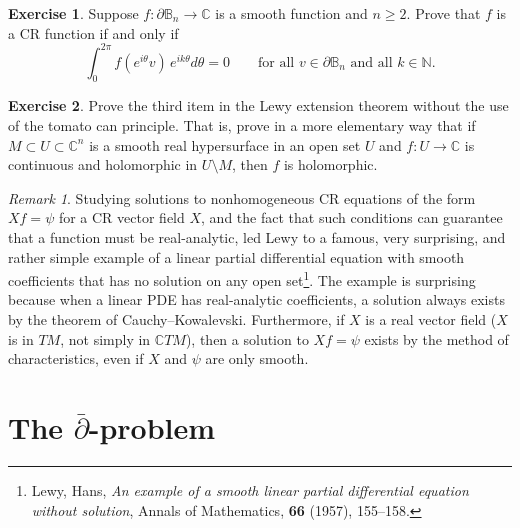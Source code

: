 \documentclass[12pt,openany]{book}
\newcommand{\C}{{\mathbb{C}}}
\newcommand{\N}{{\mathbb{N}}}
\newcommand{\bB}{{\mathbb{B}}}
\theoremstyle{plain}
\theoremstyle{remark}
\newtheorem{remark}[thm]{Remark}
\theoremstyle{definition}
\newenvironment{exbox}{%
    \def\FrameCommand{\vrule width 1pt \relax\hspace{10pt}}%
    \MakeFramed{\advance\hsize-\width\FrameRestore}%
}{%
    \endMakeFramed
}
\theoremstyle{exercise}
\newtheorem{exercise}{Exercise}[section]
\theoremstyle{example}
\begin{document}
\begin{exbox}
\begin{exercise}
Suppose $f \colon \partial \bB_n \to \C$ is a smooth function and $n \geq 2$.
Prove that $f$ is a CR function if and only if
\begin{equation*}
\int_0^{2\pi} f(e^{i\theta}v) \, e^{ik\theta} d\theta = 0
\qquad
\text{for all $v \in \partial \bB_n$ and all $k \in \N$.}
\end{equation*}
\end{exercise}

\begin{exercise}
Prove the third item in the Lewy extension theorem without the use
of the tomato can principle.  That is, prove in a more elementary
way that if $M \subset U \subset \C^n$ is a smooth real hypersurface
in an open set $U$ and $f \colon U \to \C$ is continuous
and holomorphic in $U \setminus M$, then $f$ is holomorphic.
\end{exercise}
\end{exbox}

\begin{remark}
Studying solutions to nonhomogeneous CR equations of the form $X f = \psi$
for a CR vector field $X$,
and the fact that such conditions can guarantee
that a function must be real-analytic, led Lewy to a famous, very
surprising, and rather simple
example of a
linear partial differential equation with smooth coefficients
that has no solution on any open set\footnote{%
Lewy, Hans, \emph{An example of a smooth linear partial differential
equation without solution}, Annals of Mathematics, \textbf{66} (1957), 155--158.}.
The example is surprising because when a linear PDE has real-analytic
coefficients, a solution always exists by the theorem of Cauchy--Kowalevski.
Furthermore, if $X$ is a real vector field ($X$ is in $TM$, not simply in $\C TM$),
then a solution to $Xf = \psi$ exists by the method of characteristics, even
if $X$ and $\psi$ are only smooth.
\end{remark}


\chapter{The \texorpdfstring{$\bar{\partial}$}{dbar}-problem} \label{ch:dbar}
\end{document}
